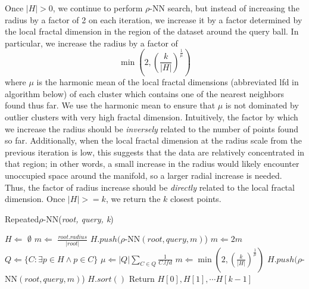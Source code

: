 Once $|H| > 0$, we continue to perform $\rho$-NN search, but instead of 
increasing the radius by a factor of 2 on each iteration, we increase it by a factor determined 
by the local fractal dimension in the region of the dataset around the query ball. 
In particular, 
we increase the radius by a factor of 
\begin{equation} \min \left(2, \left({\frac{k}{|H|}}\right)^{\frac{1}{\mu}}\right) \label{2} \end{equation}
where $\mu$ is the harmonic mean of the local fractal dimensions (abbreviated lfd in algorithm below) of 
each cluster which contains one of the nearest neighbors found thus far. We use the harmonic mean to 
ensure that $\mu$ is not dominated by outlier clusters with very high fractal dimension. 
Intuitively, the factor by which we increase the radius should be \emph{inversely} related to the number of points found so far. 
Additionally, when the local fractal dimension at the radius scale from the previous iteration is low, this suggests that the data 
are relatively concentrated in that region; in other words, a small increase in the radius would likely encounter unoccupied space around the manifold, so a larger radial increase is needed. Thus, the factor of radius increase should be \emph{directly} related to the 
local fractal dimension. Once $|H| >= k$, we return the $k$ closest points.

\begin{algorithm} %
    \caption{Repeated$\rho$-NN(\emph{root, query, k})} %
    \label{alg:knn-by-rnn} %
    \begin{algorithmic} %
        \STATE $H \Leftarrow$ $\emptyset$
        \STATE $m \Leftarrow$ $\frac{root.radius}{|root|}$
            \STATE $H.push(\rho$-NN$(root, query, m)$)
            \STATE $m \Leftarrow 2m$
        \ENDWHILE
            \STATE $Q \Leftarrow \{ C: \exists p \in H \land p \in C \}$
            \STATE $\mu \Leftarrow |Q| \sum_{C \in Q} \frac{1}{C.lfd} $
            \STATE $m \Leftarrow \min \left(2, \left({\frac{k}{|H|}}\right)^{\frac{1}{\mu}}\right)$
            \STATE $H.push(\rho$-NN$(root, query, m)$)
        \ENDWHILE
        \STATE $H.sort()$
        \STATE Return $H[0], H[1], \cdots H[k-1]$
    \end{algorithmic}
    \end{algorithm}


